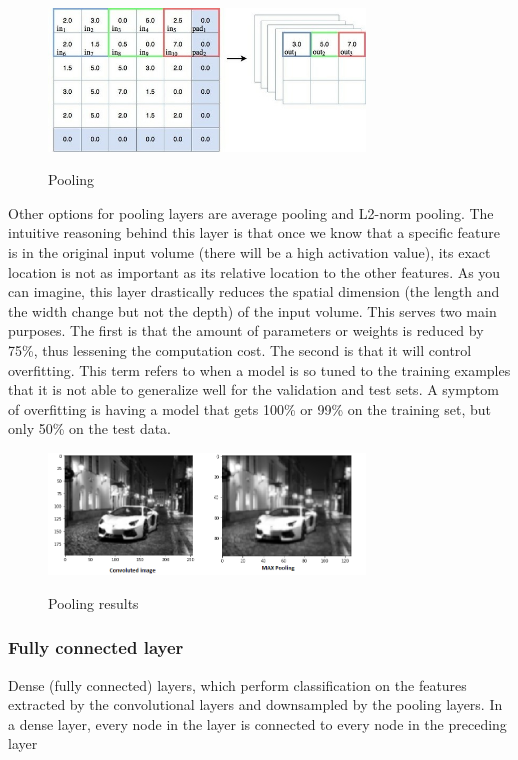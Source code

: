 \documentclass[12pt]{article}
\begin{document}
          \begin{figure}[h]
    	\centering
    	\includegraphics[width=0.75\textwidth]{popo.jpg}
       	\label{fig:mesh13}
	\caption{Pooling}
	\end{figure} 
         
         Other options for pooling layers are average pooling and L2-norm pooling. The intuitive reasoning behind this layer is that once we know that a specific feature is in the original input volume (there will be a high activation value), its exact location is not as important as its relative location to the other features. As you can imagine, this layer drastically reduces the spatial dimension (the length and the width change but not the depth) of the input volume. This serves two main purposes. The first is that the amount of parameters or weights is reduced by 75\%, thus lessening the computation cost. The second is that it will control overfitting. This term refers to when a model is so tuned to the training examples that it is not able to generalize well for the validation and test sets. A symptom of overfitting is having a model that gets 100\% or 99\% on the training set, but only 50\% on the test data.
        
        \begin{figure}[h]
    	\centering
    	\includegraphics[width=0.75\textwidth]{pooling.png}
       	\label{fig:mesh14}
	\caption{Pooling results}
	\end{figure} 
		
	
        \subsubsection{Fully connected layer }
        Dense (fully connected) layers, which perform classification on the features extracted by the convolutional layers and downsampled by the pooling layers. In a dense layer, every node in the layer is connected to every node in the preceding layer
\end{document}
